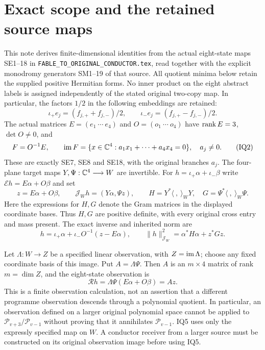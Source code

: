 \documentclass[11pt]{article}
\begin{document}
\section{Exact scope and the retained source maps}
This note derives finite-dimensional identities from the actual eight-state
maps SE1--18 in \texttt{FABLE\_TO\_ORIGINAL\_CONDUCTOR.tex}, read together
with the explicit monodromy generators SM1--19 of that source.  All quotient
minima below retain the supplied positive Hermitian forms.  No inner product
on the eight abstract labels is assigned independently of the stated original
two-copy map.  In particular, the factors $1/2$ in the following embeddings
are retained:
\[
 \iota_+e_j=(f_{j,+}+f_{j,-})/2,\qquad
 \iota_-e_j=(f_{j,+}-f_{j,-})/2.                       \tag{IQ1}
\]
The actual matrices $E=(e_1\ \cdots\ e_4)$ and $O=(o_1\ \cdots\ o_4)$
have $\operatorname{rank} E=3$, $\det O\ne0$, and
\[
 F=O^{-1}E,\qquad
 \operatorname{im} F=\{x\in\mathbb C^4:a_1x_1+\cdots+a_4x_4=0\},\quad a_j\ne0. \tag{IQ2}
\]
These are exactly SE7, SE8 and SE18, with the original branches $a_j$.
The four-plane target maps $Y,\Psi:\mathbb C^4\longrightarrow W$ are invertible.
For $h=\iota_+\alpha+\iota_-\beta$ write
$\mathcal E h=E\alpha+O\beta$ and set
\[
 z=E\alpha+O\beta,\qquad
 \mathcal J_W h=(Y\alpha,\Psi z),\qquad
 H=Y^*\langle\ ,\ \rangle_WY,\quad
 G=\Psi^*\langle\ ,\ \rangle_W\Psi.                  \tag{IQ3}
\]
Here the expressions for $H,G$ denote the Gram matrices in the displayed
coordinate bases.  Thus $H,G$ are positive definite, with every original
cross entry and mass present.  The exact inverse and inherited norm are
\[
 h=\iota_+\alpha+\iota_-O^{-1}(z-E\alpha),\qquad
 \|h\|_{\mathcal J_W}^2=\alpha^*H\alpha+z^*Gz.         \tag{IQ4}
\]

Let $\Lambda:W\to Z$ be a specified linear observation, with $Z=\operatorname{im}\Lambda$;
choose any fixed coordinate basis of this image.  Put $A=\Lambda\Psi$.
Then $A$ is an $m\times4$ matrix of rank $m=\dim Z$, and the eight-state
observation is
\[
 \mathcal R h=\Lambda\Psi(E\alpha+O\beta)=Az.          \tag{IQ5}
\]
This is a finite observation calculation, not an assertion that a different
programme observation descends through a polynomial quotient.  In particular,
an observation defined on a larger original polynomial space cannot be applied
to $\mathcal P_{v+3}/\mathcal P_{v-1}$ without proving that it annihilates
$\mathcal P_{v-1}$.  IQ5 uses only the expressly specified map on $W$.  A
conductor receiver from a larger source must be constructed on its original
observation image before using IQ5.
\end{document}
